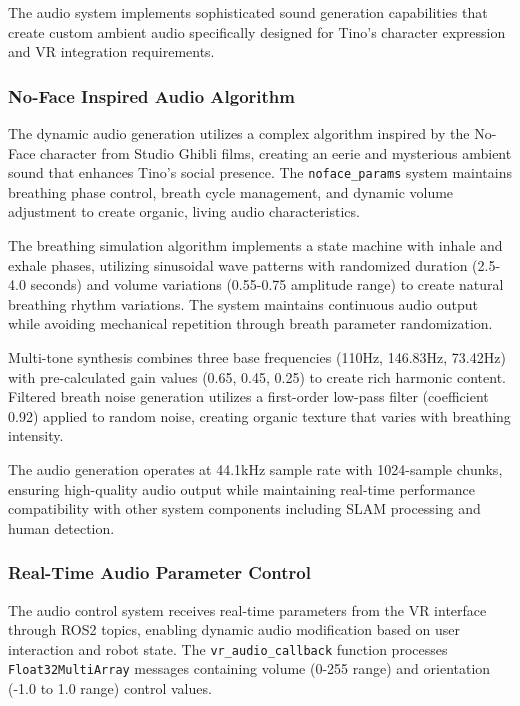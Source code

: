 The audio system implements sophisticated sound generation capabilities that create custom ambient audio specifically designed for Tino's character expression and VR integration requirements.

\subsubsection{No-Face Inspired Audio Algorithm}

The dynamic audio generation utilizes a complex algorithm inspired by the No-Face character from Studio Ghibli films, creating an eerie and mysterious ambient sound that enhances Tino's social presence. The \texttt{noface\_params} system maintains breathing phase control, breath cycle management, and dynamic volume adjustment to create organic, living audio characteristics.

The breathing simulation algorithm implements a state machine with inhale and exhale phases, utilizing sinusoidal wave patterns with randomized duration (2.5-4.0 seconds) and volume variations (0.55-0.75 amplitude range) to create natural breathing rhythm variations. The system maintains continuous audio output while avoiding mechanical repetition through breath parameter randomization.

Multi-tone synthesis combines three base frequencies (110Hz, 146.83Hz, 73.42Hz) with pre-calculated gain values (0.65, 0.45, 0.25) to create rich harmonic content. Filtered breath noise generation utilizes a first-order low-pass filter (coefficient 0.92) applied to random noise, creating organic texture that varies with breathing intensity.

The audio generation operates at 44.1kHz sample rate with 1024-sample chunks, ensuring high-quality audio output while maintaining real-time performance compatibility with other system components including SLAM processing and human detection.

\subsubsection{Real-Time Audio Parameter Control}

The audio control system receives real-time parameters from the VR interface through ROS2 topics, enabling dynamic audio modification based on user interaction and robot state. The \texttt{vr\_audio\_callback} function processes \texttt{Float32MultiArray} messages containing volume (0-255 range) and orientation (-1.0 to 1.0 range) control values.

